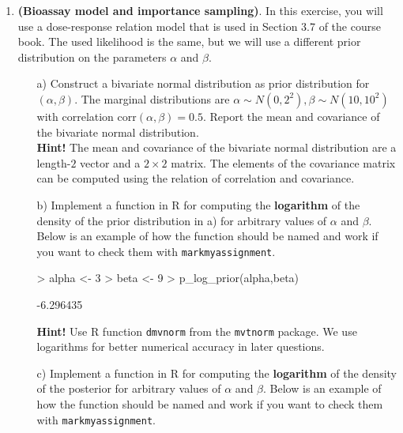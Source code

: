 \documentclass[11pt,a4paper,english]{article}
\begin{document}
\begin{enumerate}

\item {\bf (Bioassay model and importance sampling)}. In this exercise, you will use a dose-response relation model that is used in Section 3.7 of the course book. The used likelihood is the same, but
we will use a different prior distribution on the parameters $\alpha$ and $\beta$.


\begin{itemize}
    \item[a)] Construct a bivariate normal distribution as prior distribution for $(\alpha,\beta)$.
    The marginal distributions are $\alpha \sim N(0,2^2), \beta \sim N(10,10^2)$ with correlation $\mathrm{corr}(\alpha, \beta)=0.5$. Report the mean and covariance
    of the bivariate normal distribution.\\
\textbf{Hint!} The mean and covariance of the bivariate normal distribution are a length-$2$ vector and a $2 \times 2$ matrix. The elements of the covariance matrix can be computed using the relation of correlation and covariance.
  \item[b)] Implement a function in R for computing the \textbf{logarithm} of the density of the
  prior distribution in a) for arbitrary values of $\alpha$ and $\beta$. Below is an example of how the function should be named and work if you want to check them with \texttt{markmyassignment}. 
  
\begin{Schunk}
\begin{Sinput}
> alpha <- 3
> beta <- 9
> p_log_prior(alpha,beta)
\end{Sinput}
\begin{Soutput}
[1] -6.296435
\end{Soutput}
\end{Schunk}
 
\textbf{Hint!} Use R function {\tt dmvnorm} from the {\tt mvtnorm} package. We use logarithms for better numerical accuracy in later questions.

\item[c)] Implement a function in R for computing the \textbf{logarithm} of the density of the posterior for arbitrary values of $\alpha$ and $\beta$. Below is an example of how the function should be named and work if you want to check them with \texttt{markmyassignment}. 
 

\end{itemize}
\end{enumerate}
\end{document}
